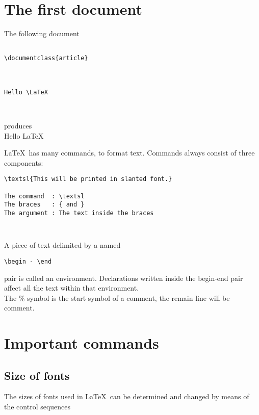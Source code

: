 \newpage

\section{The first document}

The following document

\begin{verbatim}

\documentclass{article}



Hello \LaTeX



\end{verbatim}

produces\\

Hello \LaTeX\\

\medskip

\LaTeX\ has many commands, to format text. Commands always consist of three components:

\begin{verbatim}
\textsl{This will be printed in slanted font.}

The command  : \textsl
The braces   : { and }
The argument : The text inside the braces
\end{verbatim}


\begin{verbatim}


\end{verbatim}

A piece of text delimited by a named
\begin{verbatim}
\begin - \end
\end{verbatim}
 pair is called an environment.
Declarations written inside the begin-end pair affect all the text within that environment.\\

The \% symbol is the start symbol of a comment, the remain line will be comment.

\newpage

\section{Important commands}

\subsection{Size of fonts}
The sizes of fonts used in \LaTeX\ can be determined and changed by means of the control sequences

